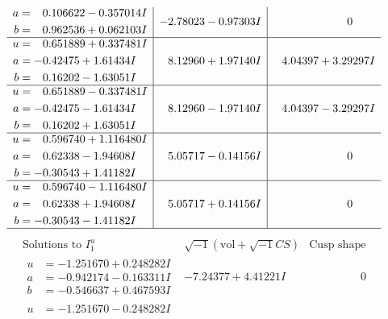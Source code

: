 \documentclass[1p]{elsarticle_modified}
\theoremstyle{definition}
\newcommand{\I}{\sqrt{-1}}
\begin{document}
$$\begin{array}{c|c|c}
\begin{aligned}
a &= \phantom{-}0.106622 - 0.357014 I \\
b &= \phantom{-}0.962536 + 0.062103 I\end{aligned}
 & -2.78023 - 0.97303 I & \phantom{-0.000000 } 0 \\ \hline\begin{aligned}
u &= \phantom{-}0.651889 + 0.337481 I \\
a &= -0.42475 + 1.61434 I \\
b &= \phantom{-}0.16202 - 1.63051 I\end{aligned}
 & \phantom{-}8.12960 + 1.97140 I & \phantom{-}4.04397 + 3.29297 I \\ \hline\begin{aligned}
u &= \phantom{-}0.651889 - 0.337481 I \\
a &= -0.42475 - 1.61434 I \\
b &= \phantom{-}0.16202 + 1.63051 I\end{aligned}
 & \phantom{-}8.12960 - 1.97140 I & \phantom{-}4.04397 - 3.29297 I \\ \hline\begin{aligned}
u &= \phantom{-}0.596740 + 1.116480 I \\
a &= \phantom{-}0.62338 - 1.94608 I \\
b &= -0.30543 + 1.41182 I\end{aligned}
 & \phantom{-}5.05717 - 0.14156 I & \phantom{-0.000000 } 0 \\ \hline\begin{aligned}
u &= \phantom{-}0.596740 - 1.116480 I \\
a &= \phantom{-}0.62338 + 1.94608 I \\
b &= -0.30543 - 1.41182 I\end{aligned}
 & \phantom{-}5.05717 + 0.14156 I & \phantom{-0.000000 } 0\\
 \hline 
 \end{array}$$\newpage$$\begin{array}{c|c|c}  
\text{Solutions to }I^u_{1}& \I (\text{vol} + \sqrt{-1}CS) & \text{Cusp shape}\\
 \hline 
\begin{aligned}
u &= -1.251670 + 0.248282 I \\
a &= -0.942174 - 0.163311 I \\
b &= -0.546637 + 0.467593 I\end{aligned}
 & -7.24377 + 4.41221 I & \phantom{-0.000000 } 0 \\ \hline\begin{aligned}
u &= -1.251670 - 0.248282 I \\

\end{aligned}
\end{array}$$
\end{document}
